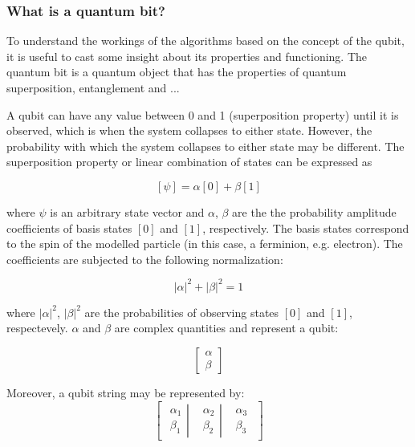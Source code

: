 \subsubsection{What is a quantum bit?}

To understand the workings of the algorithms based on the concept of the qubit, it is useful to cast some insight about its properties and functioning.
The quantum bit is a quantum object that has the properties of quantum superposition, entanglement and ...


A qubit can have any value between 0 and 1 (superposition property) until it is observed, which is when the system collapses to either state. However, the probability with which the system collapses to either state  may be different. The superposition property or linear combination of states can be expressed as

$$
[\psi] = \alpha[0] + \beta[1]
$$

where $\psi$ is an arbitrary state vector and $\alpha$, $\beta$ are the the probability amplitude coefficients of basis states $[0]$ and $[1]$, respectively. The basis states correspond to the spin of the modelled particle (in this case, a ferminion, e.g. electron). The coefficients are subjected to the following normalization:

$$|\alpha|^2 + |\beta|^2 = 1$$

where $|\alpha|^2$, $|\beta|^2$ are the probabilities of observing states $[0]$ and $[1]$, respectevely. $\alpha$ and $\beta$ are complex quantities and represent a qubit:

$$\begin{bmatrix}
\alpha \\
\beta
\end{bmatrix}$$

Moreover, a qubit string may be represented by:
$$
\begin{bmatrix}
\left.\begin{matrix}
\alpha_1\\ 
\beta_1
\end{matrix}\right| & \left.\begin{matrix}
\alpha_2\\ 
\beta_2
\end{matrix}\right| & \begin{matrix}
\alpha_3\\ 
\beta_3
\end{matrix}
\end{bmatrix}
$$

